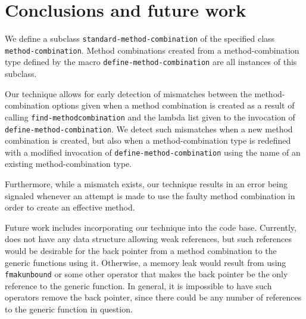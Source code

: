 \section{Conclusions and future work}
\label{sec-conclusions}

We define a subclass \texttt{standard-method-combination} of the
specified class \texttt{method-combination}.  Method combinations
created from a method-combination type defined by the macro
\texttt{define-method-combination} are all instances of this subclass.

Our technique allows for early detection of mismatches between the
method-combination options given when a method combination is created
as a result of calling \texttt{find-method\-combination} and the lambda
list given to the invocation of \texttt{define-method-combination}.
We detect such mismatches when a new method combination is created,
but also when a method-combination type is redefined with a modified
invocation of \texttt{define-method-combination} using the name
of an existing method-combination type.

Furthermore, while a mismatch exists, our technique results in an
error being signaled whenever an attempt is made to use the faulty
method combination in order to create an effective method.

Future work includes incorporating our technique into the \sicl{} code
base.  Currently, \sicl{} does not have any data structure allowing
weak references, but such references would be desirable for the back
pointer from a method combination to the generic functions using it.
Otherwise, a memory leak would result from using \texttt{fmakunbound}
or some other operator that makes the back pointer be the only
reference to the generic function.  In general, it is impossible to
have such operators remove the back pointer, since there could be any
number of references to the generic function in question.
